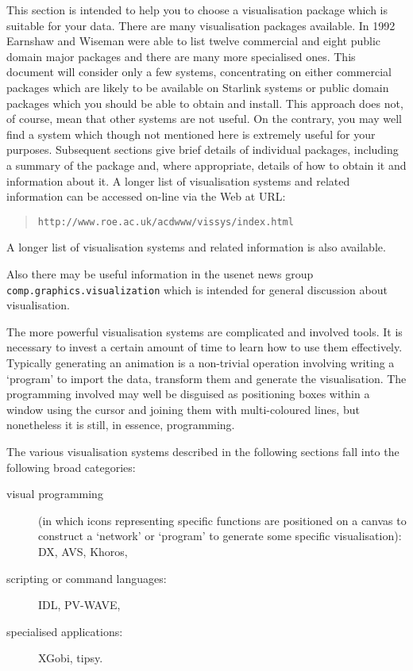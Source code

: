 \documentclass[twoside,11pt]{article}
\newcommand{\htmladdnormallink}[2]{#1}
\newenvironment{latexonly}{}{}
\begin{document}
This section is intended to help you to choose a visualisation package
which is suitable for your data. There are many visualisation packages
available. In 1992 Earnshaw and Wiseman\cite{EARNSHAW} were able to
list twelve commercial and eight public domain major packages and there
are many more specialised ones. This document will consider only a few
systems, concentrating on either commercial packages which are likely to
be available on Starlink systems or public domain packages which you
should be able to obtain and install. This approach does not, of course,
mean that other systems are not useful. On the contrary, you may well
find a system which though not mentioned here is extremely useful for
your purposes. Subsequent sections give brief details of individual
packages, including a summary of the package and, where appropriate,
details of how to obtain it and information about it.
\begin{latexonly}
A longer list of visualisation systems and related information can
be accessed on-line via the Web at URL:
\begin{quote}
{\tt http://www.roe.ac.uk/acdwww/vissys/index.html}
\end{quote}
\end{latexonly}
\begin{htmlonly}
A longer list of
\htmladdnormallink{visualisation systems and related information}
{http://www.roe.ac.uk/acdwww/vissys/index.html} is also available.
\end{htmlonly}
Also there may be useful information in the usenet news group {\tt
comp.graphics.visualization} which is intended for general discussion
about visualisation.

The more powerful visualisation systems are complicated and involved
tools. It is necessary to invest a certain amount of time to learn how
to use them effectively. Typically generating an animation is a
non-trivial operation involving writing a `program' to import the data,
transform them and generate the visualisation. The programming involved
may well be disguised as positioning boxes within a window using the
cursor and joining them with multi-coloured lines, but nonetheless it is
still, in essence, programming.

The various visualisation systems described in the following sections
fall into the following broad categories:

\begin{description}

  \item[visual programming] (in which icons representing specific
   functions are positioned on a canvas to construct a `network' or
   `program' to generate some specific visualisation): DX, AVS,
   Khoros,

  \item[scripting or command languages:] IDL, PV-WAVE,

  \item[specialised applications:] XGobi, tipsy.

\end{description}
\end{document}
